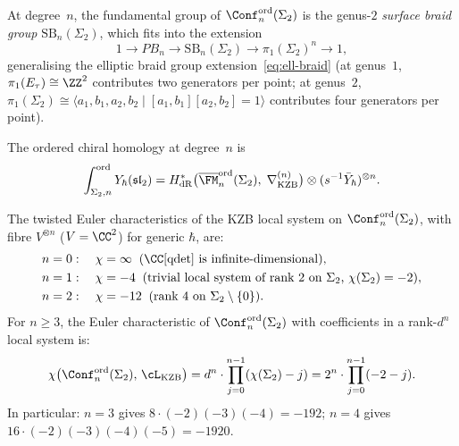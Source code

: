 At degree~$n$, the fundamental group of
$\Conf_n^{\mathrm{ord}}(\Sigma_2)$ is the genus-$2$
\emph{surface braid group} $\mathrm{SB}_n(\Sigma_2)$, which
fits into the extension
\begin{equation}\label{eq:surface-braid-g2}
  1 \to PB_n \to \mathrm{SB}_n(\Sigma_2) \to
  \pi_1(\Sigma_2)^n \to 1,
\end{equation}
generalising the elliptic braid group
extension~\eqref{eq:ell-braid} (at genus~$1$,
$\pi_1(E_\tau) \cong \ZZ^2$ contributes two generators
per point; at genus~$2$,
$\pi_1(\Sigma_2) \cong \langle a_1, b_1, a_2, b_2 \mid
[a_1, b_1][a_2, b_2] = 1\rangle$ contributes four
generators per point).

The ordered chiral homology at degree~$n$ is
\begin{equation}\label{eq:g2-degree-n}
  \int_{\Sigma_2, n}^{\mathrm{ord}}
  Y_\hbar(\mathfrak{sl}_2)
  = H^*_{\mathrm{dR}}\bigl(
  \overline{\FM}_n^{\mathrm{ord}}(\Sigma_2),\;
  \nabla_{\mathrm{KZB}}^{(n)}\bigr)
  \otimes (s^{-1}\bar{Y}_\hbar)^{\otimes n}.
\end{equation}

\begin{proposition}
\label{prop:g2-euler-n}
The twisted Euler characteristics of the KZB local system on
$\Conf_n^{\mathrm{ord}}(\Sigma_2)$, with fibre $V^{\otimes n}$
\textup{(}$V = \CC^2$\textup{)} for generic $\hbar$, are:
\begin{align}
  n = 0&: \quad \chi = \infty
  \;\;\text{\textup{(}$\CC[\operatorname{qdet}]$ is
  infinite-dimensional\textup{)}},
  \label{eq:g2-euler-n0} \\
  n = 1&: \quad \chi = -4
  \;\;\text{\textup{(}trivial local system of rank $2$
  on $\Sigma_2$,
  $\chi(\Sigma_2) = -2$\textup{)}},
  \label{eq:g2-euler-n1} \\
  n = 2&: \quad \chi = -12
  \;\;\text{\textup{(}rank $4$ on $\Sigma_2 \setminus
  \{0\}$\textup{)}}.
  \label{eq:g2-euler-n2}
\end{align}
For $n \geq 3$, the Euler characteristic of
$\Conf_n^{\mathrm{ord}}(\Sigma_2)$ with coefficients in a
rank-$d^n$ local system is:
\begin{equation}\label{eq:g2-euler-general}
  \chi\bigl(\Conf_n^{\mathrm{ord}}(\Sigma_2),\,
  \cL_{\mathrm{KZB}}\bigr)
  = d^n \cdot \prod_{j=0}^{n-1}(\chi(\Sigma_2) - j)
  = 2^n \cdot \prod_{j=0}^{n-1}(-2 - j).
\end{equation}
In particular: $n = 3$ gives
$8 \cdot (-2)(-3)(-4) = -192$;
$n = 4$ gives $16 \cdot (-2)(-3)(-4)(-5) = -1920$.
\end{proposition}

